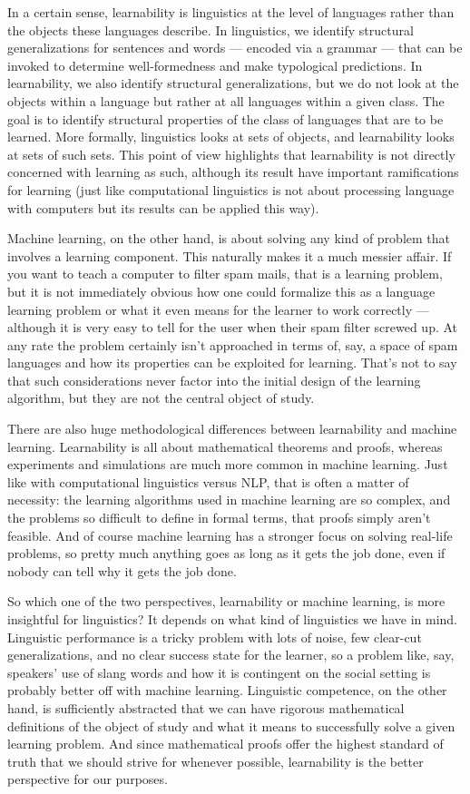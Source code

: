 In a certain sense, learnability is linguistics at the level of languages rather than the objects these languages describe.
In linguistics, we identify structural generalizations for sentences and words --- encoded via a grammar --- that can be invoked to determine well-formedness and make typological predictions.
In learnability, we also identify structural generalizations, but we do not look at the objects within a language but rather at all languages within a given class.
The goal is to identify structural properties of the class of languages that are to be learned.
More formally, linguistics looks at sets of objects, and learnability looks at sets of such sets.
This point of view highlights that learnability is not directly concerned with learning as such, although its result have important ramifications for learning (just like computational linguistics is not about processing language with computers but its results can be applied this way).

Machine learning, on the other hand, is about solving any kind of problem that involves a learning component.
This naturally makes it a much messier affair.
If you want to teach a computer to filter spam mails, that is a learning problem, but it is not immediately obvious how one could formalize this as a language learning problem or what it even means for the learner to work correctly --- although it is very easy to tell for the user when their spam filter screwed up.
At any rate the problem certainly isn't approached in terms of, say, a space of spam languages and how its properties can be exploited for learning.
That's not to say that such considerations never factor into the initial design of the learning algorithm, but they are not the central object of study.

There are also huge methodological differences between learnability and machine learning.
Learnability is all about mathematical theorems and proofs, whereas experiments and simulations are much more common in machine learning.
Just like with computational linguistics versus NLP, that is often a matter of necessity: the learning algorithms used in machine learning are so complex, and the problems so difficult to define in formal terms, that proofs simply aren't feasible.
And of course machine learning has a stronger focus on solving real-life problems, so pretty much anything goes as long as it gets the job done, even if nobody can tell why it gets the job done.

So which one of the two perspectives, learnability or machine learning, is more insightful for linguistics?
It depends on what kind of linguistics we have in mind.
Linguistic performance is a tricky problem with lots of noise, few clear-cut generalizations, and no clear success state for the learner, so a problem like, say, speakers' use of slang words and how it is contingent on the social setting is probably better off with machine learning.
Linguistic competence, on the other hand, is sufficiently abstracted that we can have rigorous mathematical definitions of the object of study and what it means to successfully solve a given learning problem.
And since mathematical proofs offer the highest standard of truth that we should strive for whenever possible, learnability is the better perspective for our purposes.

